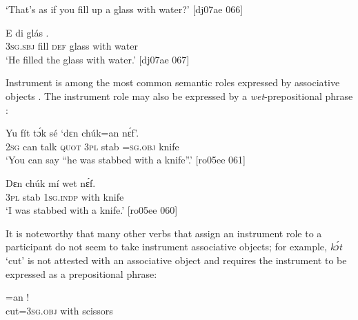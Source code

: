\glt ‘That’s as if you fill up a glass with water?’ [dj07ae 066]
\z


\ea%
    \label{ex:key:1176}
    \gll E      di  glás        .\\
\textsc{3sg.sbj}  fill    \textsc{def}  glass  with    water\\

\glt ‘He filled the glass with water.’ [dj07ae 067]
\z

Instrument\index{} is among the most common semantic roles expressed by associative objects . The instrument role may also be expressed by a \textit{wet}{}-prepositional phrase :


\ea%
    \label{ex:key:1177}
    \gll Yu  fít  tɔ́k  sé    ‘dɛn    chúk=an    nɛ́f’.\\
\textsc{2sg}  can  talk  \textsc{quot}    \textsc{3pl}    {stab  =\textsc{sg}.\textsc{obj}}  knife\\

\glt ‘You can say “he was stabbed with a knife”.’ [ro05ee 061]
\z


\ea%
    \label{ex:key:1178}
    \gll Dɛn  chúk  mí    wet    nɛ́f.\\
\textsc{3pl}  stab    \textsc{1sg.indp}  with    knife\\

\glt ‘I was stabbed with a knife.’ [ro05ee 060]
\z

It is noteworthy that many other verbs that assign an instrument role to a participant do not seem to take instrument associative objects; for example, \textit{kɔ́t} ‘cut’ is not attested with an associative object and requires the instrument to be expressed as a prepositional phrase: 


\z


\ea%
    \label{ex:key:1180}
    \gll {}=an        !\\
cut=\textsc{3sg.obj}  with    scissors\\

